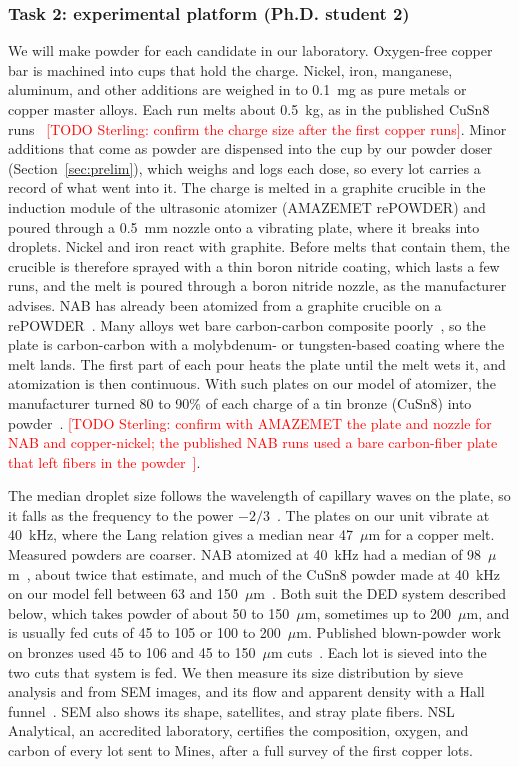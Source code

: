 \documentclass[12pt,letterpaper]{article}
\newcommand{\todo}[1]{\textcolor{red}{[TODO Sterling: #1]}}
\begin{document}
\subsubsection{Task 2: experimental platform (Ph.D. student 2)}
\label{sec:task2}
We will make powder for each candidate in our laboratory.
Oxygen-free copper bar is machined into cups that hold the charge.
Nickel, iron, manganese, aluminum, and other additions are weighed in to 0.1~mg as pure metals or copper master alloys.
Each run melts about 0.5~kg, as in the published CuSn8
runs~\cite{choma2026} \todo{confirm the charge size after the first copper
runs}. Minor additions that come as powder are dispensed into the cup by our
powder doser (Section~\ref{sec:prelim}), which weighs and logs each dose, so every lot carries a record of what went into it. The charge is
melted in a graphite
crucible in the induction module of the ultrasonic atomizer (AMAZEMET
rePOWDER) and poured through a 0.5~mm nozzle onto a vibrating plate, where it
breaks into droplets.
Nickel and iron react with graphite.
Before melts that contain them, the crucible is therefore sprayed with a thin boron nitride coating, which lasts a few runs, and the melt is poured through a boron nitride nozzle, as the manufacturer advises.
NAB has already been atomized from a
graphite crucible on a rePOWDER~\cite{muller2023}. Many alloys wet bare carbon-carbon
composite poorly~\cite{choma2026}, so the plate is carbon-carbon with a
molybdenum- or tungsten-based coating where the melt lands. The first part of
each pour heats the plate until the melt wets it, and atomization is then
continuous. With such plates on our model of atomizer, the manufacturer
turned 80 to 90\% of each charge of a tin bronze (CuSn8) into
powder~\cite{choma2026}. \todo{confirm with AMAZEMET the plate and nozzle
for NAB and copper-nickel; the published NAB runs used a bare carbon-fiber
plate that left fibers in the powder~\cite{uhlmann2024}}.

The median droplet size follows the wavelength of capillary waves on the
plate, so it falls as the frequency to the power $-2/3$~\cite{lang1962}. The
plates on our unit vibrate at 40~kHz, where the Lang relation gives a median
near 47~$\mu$m for a copper melt. Measured powders are coarser. NAB atomized
at 40~kHz had a median of 98~$\mu$m~\cite{uhlmann2024}, about twice that
estimate, and much of the CuSn8 powder made at 40~kHz on our model fell
between 63 and 150~$\mu$m~\cite{choma2026}. Both suit the DED system
described below, which takes powder of about 50 to 150~$\mu$m, sometimes up
to 200~$\mu$m, and is usually fed cuts of 45 to 105 or 100 to 200~$\mu$m.
Published blown-powder work on bronzes used 45 to 106 and 45 to 150~$\mu$m
cuts~\cite{li2021,pi2025}. Each lot is sieved into the two cuts that system
is fed. We then measure its size distribution by sieve analysis and from SEM
images, and its flow and apparent density with a Hall
funnel~\cite{astmB213,astmB212}. SEM also shows its shape, satellites, and
stray plate fibers. NSL Analytical, an accredited laboratory, certifies the
composition, oxygen, and carbon of every lot sent to Mines, after a full
survey of the first copper lots.
\end{document}
